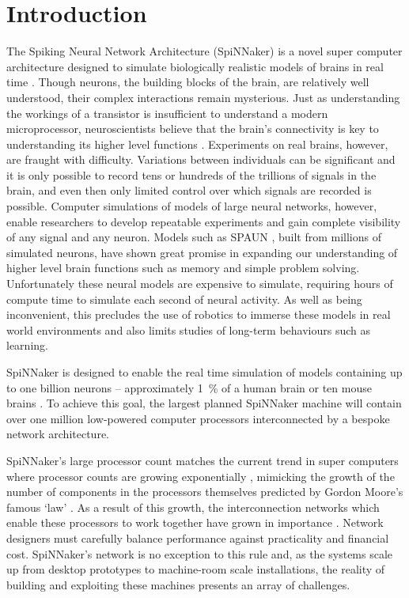 \chapter{Introduction}

\label{sec:introduction}

%

The Spiking Neural Network Architecture (SpiNNaker) is a novel super computer
architecture designed to simulate biologically realistic models of brains in
real time \cite{furber07}. Though neurons, the building blocks of the brain,
are relatively well understood, their complex interactions remain mysterious.
Just as understanding the workings of a transistor is insufficient to
understand a modern microprocessor, neuroscientists believe that the brain's
connectivity is key to understanding its higher level functions
\cite{eliasmith13,eliasmith14}. Experiments on real brains, however, are
fraught with difficulty. Variations between individuals can be significant and
it is only possible to record tens or hundreds of the trillions of signals in
the brain, and even then only limited control over which signals are recorded
is possible. Computer simulations of models of large neural networks, however,
enable researchers to develop repeatable experiments and gain complete
visibility of any signal and any neuron. Models such as SPAUN
\cite{eliasmith12}, built from millions of simulated neurons, have shown great
promise in expanding our understanding of higher level brain functions such as
memory and simple problem solving.  Unfortunately these neural models are
expensive to simulate, requiring hours of compute time to simulate each second
of neural activity. As well as being inconvenient, this precludes the use of
robotics to immerse these models in real world environments and also limits
studies of long-term behaviours such as learning.

SpiNNaker is designed to enable the real time simulation of models containing
up to one billion neurons -- approximately \SI{1}{\percent} of a human brain or
ten mouse brains \cite{furber06}. To achieve this goal, the largest planned
SpiNNaker machine will contain over one million low-powered computer processors
interconnected by a bespoke network architecture.

SpiNNaker's large processor count matches the current trend in super computers
where processor counts are growing exponentially \cite{meuer16j}, mimicking the
growth of the number of components in the processors themselves predicted by
Gordon Moore's famous `law' \cite{moore75}. As a result of this growth, the
interconnection networks which enable these processors to work together have
grown in importance \cite{dally04}.  Network designers must carefully balance
performance against practicality and financial cost.  SpiNNaker's network is no
exception to this rule and, as the systems scale up from desktop prototypes to
machine-room scale installations, the reality of building and exploiting these
machines presents an array of challenges.

